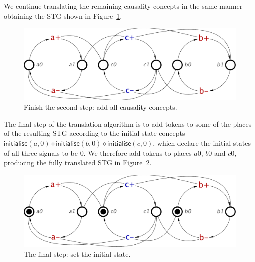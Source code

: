 \documentclass[british, journal]{IEEEtran}
\begin{document}
We continue translating the remaining causality concepts in the same manner
obtaining the STG shown in Figure~\ref{fig:step-by-step9}.

\vspace{-2mm}
\begin{figure}[h]
\begin{centering}
\includegraphics[scale=0.3]{Images/Step-by-step9}
\par
\protect\caption{\label{fig:step-by-step9}Finish the second step: add all causality concepts.}
\vspace{-2mm}
\par\end{centering}
\end{figure}

The final step of the translation algorithm is to add tokens to some of the places
of the resulting STG according to the initial state concepts
$\mathsf{initialise}(a,0) \diamond \mathsf{initialise}(b,0) \diamond \mathsf{initialise}(c,0)$, which declare the initial states of all three signals to be 0. We therefore
add tokens to places $a0$, $b0$ and $c0$, producing the fully translated STG in
Figure~\ref{fig:step-by-step12}.

\begin{figure}[h]
\begin{centering}
\includegraphics[scale=0.3]{Images/Step-by-step12}
\par
\protect\caption{\label{fig:step-by-step12}The final step: set the initial state.}
\par\end{centering}
\vspace{-3mm}
\end{figure}
\end{document}

